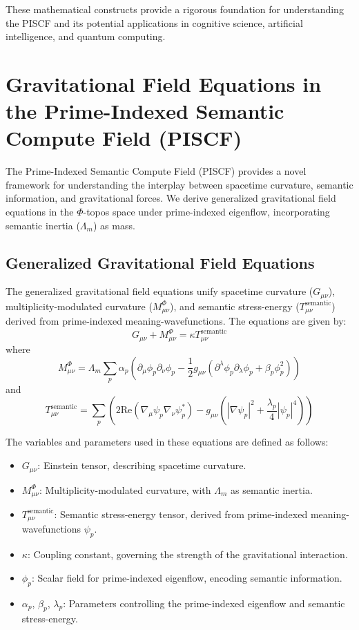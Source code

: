 \documentclass{article}
\theoremstyle{plain}
\begin{document}
These mathematical constructs provide a rigorous foundation for understanding the PISCF and its potential applications in cognitive science, artificial intelligence, and quantum computing.

\section{Gravitational Field Equations in the Prime-Indexed Semantic Compute Field (PISCF)}

The Prime-Indexed Semantic Compute Field (PISCF) provides a novel framework for understanding the interplay between spacetime curvature, semantic information, and gravitational forces. We derive generalized gravitational field equations in the $\Phi$-topos space under prime-indexed eigenflow, incorporating semantic inertia ($\Lambda_m$) as mass.

\subsection{Generalized Gravitational Field Equations}

The generalized gravitational field equations unify spacetime curvature ($G_{\mu\nu}$), multiplicity-modulated curvature ($M_{\mu\nu}^{\Phi}$), and semantic stress-energy ($T_{\mu\nu}^{\text{semantic}}$) derived from prime-indexed meaning-wavefunctions. The equations are given by:
\begin{equation}
G_{\mu\nu} + M_{\mu\nu}^{\Phi} = \kappa T_{\mu\nu}^{\text{semantic}}
\end{equation}
where
\begin{equation}
M_{\mu\nu}^{\Phi} = \Lambda_m \sum_p \alpha_p \left( \partial_\mu \phi_p \partial_\nu \phi_p - \frac{1}{2} g_{\mu\nu} (\partial^\lambda \phi_p \partial_\lambda \phi_p + \beta_p \phi_p^2) \right)
\end{equation}
and
\begin{equation}
T_{\mu\nu}^{\text{semantic}} = \sum_p \left( 2 \text{Re}(\nabla_\mu \psi_p \nabla_\nu \psi_p^*) - g_{\mu\nu} \left( |\nabla \psi_p|^2 + \frac{\lambda_p}{4} |\psi_p|^4 \right) \right)
\end{equation}

The variables and parameters used in these equations are defined as follows:
\begin{itemize}
    \item $G_{\mu\nu}$: Einstein tensor, describing spacetime curvature.
    \item $M_{\mu\nu}^{\Phi}$: Multiplicity-modulated curvature, with $\Lambda_m$ as semantic inertia.
    \item $T_{\mu\nu}^{\text{semantic}}$: Semantic stress-energy tensor, derived from prime-indexed meaning-wavefunctions $\psi_p$.
    \item $\kappa$: Coupling constant, governing the strength of the gravitational interaction.
    \item $\phi_p$: Scalar field for prime-indexed eigenflow, encoding semantic information.
    \item $\alpha_p$, $\beta_p$, $\lambda_p$: Parameters controlling the prime-indexed eigenflow and semantic stress-energy.
\end{itemize}
\end{document}
